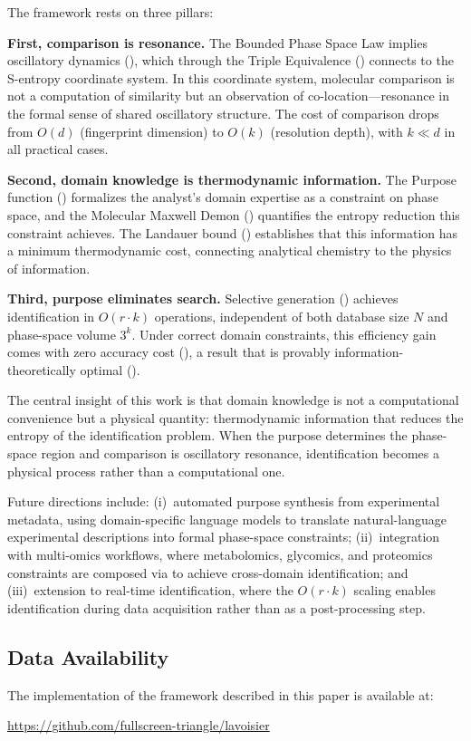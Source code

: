 \documentclass[11pt,twocolumn,a4paper]{article}
\theoremstyle{definition}
\theoremstyle{remark}
\begin{document}
The framework rests on three pillars:

\textbf{First, comparison is resonance.} The Bounded Phase Space Law implies oscillatory dynamics (), which through the Triple Equivalence () connects to the S-entropy coordinate system. In this coordinate system, molecular comparison is not a computation of similarity but an observation of co-location---resonance in the formal sense of shared oscillatory structure. The cost of comparison drops from $O(d)$ (fingerprint dimension) to $O(k)$ (resolution depth), with $k \ll d$ in all practical cases.

\textbf{Second, domain knowledge is thermodynamic information.} The Purpose function () formalizes the analyst's domain expertise as a constraint on phase space, and the Molecular Maxwell Demon () quantifies the entropy reduction this constraint achieves. The Landauer bound () establishes that this information has a minimum thermodynamic cost, connecting analytical chemistry to the physics of information.

\textbf{Third, purpose eliminates search.} Selective generation () achieves identification in $O(r \cdot k)$ operations, independent of both database size $N$ and phase-space volume $3^k$. Under correct domain constraints, this efficiency gain comes with zero accuracy cost (), a result that is provably information-theoretically optimal ().

The central insight of this work is that domain knowledge is not a computational convenience but a physical quantity: thermodynamic information that reduces the entropy of the identification problem. When the purpose determines the phase-space region and comparison is oscillatory resonance, identification becomes a physical process rather than a computational one.

Future directions include: (i)~automated purpose synthesis from experimental metadata, using domain-specific language models to translate natural-language experimental descriptions into formal phase-space constraints; (ii)~integration with multi-omics workflows, where metabolomics, glycomics, and proteomics constraints are composed via  to achieve cross-domain identification; and (iii)~extension to real-time identification, where the $O(r \cdot k)$ scaling enables identification during data acquisition rather than as a post-processing step.

\subsection*{Data Availability}

The implementation of the framework described in this paper is available at:
\begin{center}
\url{https://github.com/fullscreen-triangle/lavoisier}
\end{center}



\end{document}
